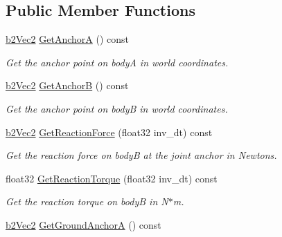 \subsection*{Public Member Functions}
\begin{DoxyCompactItemize}
\item 
\hypertarget{classb2_pulley_joint_a05ac0d0d927e9541f08b07cb1bf9ec56}{\hyperlink{structb2_vec2}{b2\-Vec2} \hyperlink{classb2_pulley_joint_a05ac0d0d927e9541f08b07cb1bf9ec56}{Get\-Anchor\-A} () const }\label{classb2_pulley_joint_a05ac0d0d927e9541f08b07cb1bf9ec56}

\begin{DoxyCompactList}\small\item\em Get the anchor point on body\-A in world coordinates. \end{DoxyCompactList}\item 
\hypertarget{classb2_pulley_joint_a5cc3596f683d621b9a885c2569ecd452}{\hyperlink{structb2_vec2}{b2\-Vec2} \hyperlink{classb2_pulley_joint_a5cc3596f683d621b9a885c2569ecd452}{Get\-Anchor\-B} () const }\label{classb2_pulley_joint_a5cc3596f683d621b9a885c2569ecd452}

\begin{DoxyCompactList}\small\item\em Get the anchor point on body\-B in world coordinates. \end{DoxyCompactList}\item 
\hypertarget{classb2_pulley_joint_a38c174bf1cf1011063ff4c16556b331e}{\hyperlink{structb2_vec2}{b2\-Vec2} \hyperlink{classb2_pulley_joint_a38c174bf1cf1011063ff4c16556b331e}{Get\-Reaction\-Force} (float32 inv\-\_\-dt) const }\label{classb2_pulley_joint_a38c174bf1cf1011063ff4c16556b331e}

\begin{DoxyCompactList}\small\item\em Get the reaction force on body\-B at the joint anchor in Newtons. \end{DoxyCompactList}\item 
\hypertarget{classb2_pulley_joint_a418b200055623474c44742b1342dd278}{float32 \hyperlink{classb2_pulley_joint_a418b200055623474c44742b1342dd278}{Get\-Reaction\-Torque} (float32 inv\-\_\-dt) const }\label{classb2_pulley_joint_a418b200055623474c44742b1342dd278}

\begin{DoxyCompactList}\small\item\em Get the reaction torque on body\-B in N$\ast$m. \end{DoxyCompactList}\item 
\hypertarget{classb2_pulley_joint_a19eefa28d2647882406ea9bfe2850a9e}{\hyperlink{structb2_vec2}{b2\-Vec2} \hyperlink{classb2_pulley_joint_a19eefa28d2647882406ea9bfe2850a9e}{Get\-Ground\-Anchor\-A} () const }\label{classb2_pulley_joint_a19eefa28d2647882406ea9bfe2850a9e}


\end{DoxyCompactItemize}

